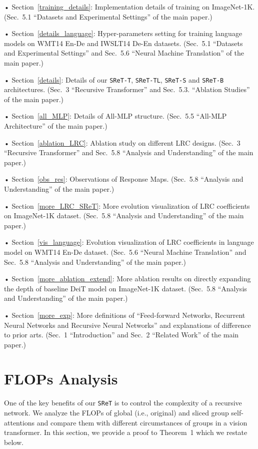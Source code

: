 \documentclass[runningheads]{llncs}
\begin{document}
	• Section~\ref{training_details}: Implementation details of training on ImageNet-1K. (Sec.~5.1 ``Datasets and Experimental Settings'' of the main paper.)
	
	• Section~\ref{details_language}: Hyper-parameters setting for training language models on WMT14 En-De and IWSLT14 De-En datasets. (Sec.~5.1 ``Datasets and Experimental Settings'' and Sec.~5.6 ``Neural Machine Translation'' of the main paper.)
	
	• Section~\ref{details}: Details of our \texttt{SReT-T}, \texttt{SReT-TL}, \texttt{SReT-S} and \texttt{SReT-B} architectures. (Sec.~3 ``Recursive Transformer'' and Sec.~5.3. ``Ablation Studies'' of the main paper.)
	
	• Section~\ref{all_MLP}: Details of All-MLP structure. (Sec.~5.5 ``All-MLP Architecture'' of the main paper.)
	
	• Section~\ref{ablation_LRC}: Ablation study on different LRC designs. (Sec.~3 ``Recursive Transformer'' and Sec.~5.8 ``Analysis and Understanding'' of the main paper.)
	
	• Section~\ref{obs_res}: Observations of Response Maps. (Sec.~5.8 ``Analysis and Understanding'' of the main paper.)
	
	• Section~\ref{more_LRC_SReT}: More evolution visualization of LRC coefficients on ImageNet-1K dataset. (Sec.~5.8 ``Analysis and Understanding'' of the main paper.)
	
	• Section~\ref{vis_language}: Evolution visualization of LRC coefficients in language model on WMT14 En-De dataset. (Sec.~5.6 ``Neural Machine Translation'' and Sec.~5.8 ``Analysis and Understanding'' of the main paper.)
	
	• Section~\ref{more_ablation_extend}: More ablation results on directly expanding the depth of baseline DeiT model on ImageNet-1K dataset. (Sec.~5.8 ``Analysis and Understanding'' of the main paper.)
	
	• Section~\ref{more_exp}: More definitions of ``Feed-forward Networks, Recurrent Neural Networks and Recursive Neural Networks'' and explanations of difference to prior arts. (Sec.~1 ``Introduction'' and Sec.~2 ``Related Work'' of the main paper.)
	
	\section{FLOPs Analysis}\label{flops}
	
	One of the key benefits of our \texttt{SReT} is to control the complexity of a recursive network. We analyze the FLOPs of global (i.e., original) and sliced group self-attentions and compare them with different circumstances of groups in a vision transformer. In this section, we provide a proof to Theorem~1 which we restate below.
	
\end{document}
